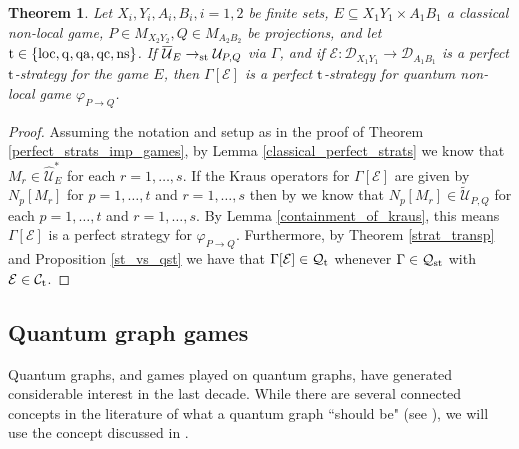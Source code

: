 \documentclass[11pt]{amsart}
\newtheorem{theorem}{Theorem}[section]
\newcommand{\cl}[1]{\mathcal{#1}}
\begin{document}
\begin{theorem}
Let $X_{i}, Y_{i}, A_{i}, B_{i}, i = 1, 2$ be finite sets, $E \subseteq X_{1}Y_{1}\times A_{1}B_{1}$ a classical non-local game, $P \in M_{X_{2}Y_{2}}, Q \in M_{A_{2}B_{2}}$ be projections, and let ${\rm t} \in \{\rm loc, q, qa, qc, ns\}$. If $\overline{\cl{U}}_{E} \rightarrow_{\rm st} \cl{U}_{P, Q}$ via $\Gamma$, and if $\cl{E}: \cl{D}_{X_{1}Y_{1}}\rightarrow \cl{D}_{A_{1}B_{1}}$ is a perfect ${\rm t}$-strategy for the game $E$, then $\Gamma[\cl{E}]$ is a perfect ${\rm t}$-strategy for quantum non-local game $\varphi_{P\rightarrow Q}$.
\end{theorem}
\begin{proof}
Assuming the notation and setup as in the proof of Theorem \ref{perfect_strats_imp_games}, by Lemma \ref{classical_perfect_strats} we know that $M_{r} \in \hat{\cl{U}}_{E}^{*}$ for each $r = 1, \hdots, s$. If the Kraus operators for $\Gamma[\cl{E}]$ are given by $N_{p}[M_{r}]$ for $p = 1, \hdots, t$ and $r = 1, \hdots, s$ then by \cite[Theorem 5.5]{gt_two} we know that $N_{p}[M_{r}] \in \tilde{\cl{U}}_{P, Q}$ for each $p = 1, \hdots, t$ and $r = 1, \hdots, s$. By Lemma \ref{containment_of_kraus}, this means $\Gamma[\cl{E}]$ is a perfect strategy for $\varphi_{P\rightarrow Q}$. Furthermore, by Theorem \ref{strat_transp} and Proposition \ref{st_vs_qst} we have that $\Gamma[\cl{E}] \in \cl{Q}_{\rm t}$ whenever $\Gamma \in \cl{Q}_{\rm st}$ with $\cl{E} \in \cl{C}_{\rm t}$. 
\end{proof}

\subsection{Quantum graph games} Quantum graphs, and games played on quantum graphs, have generated considerable interest in the last decade. While there are several connected concepts in the literature of what a quantum graph ``should be" (see \cite{bhinw, daws, dw}), we will use the concept discussed in \cite{synch_bhtt, bhtt, stahlke, tt}.
\end{document}

